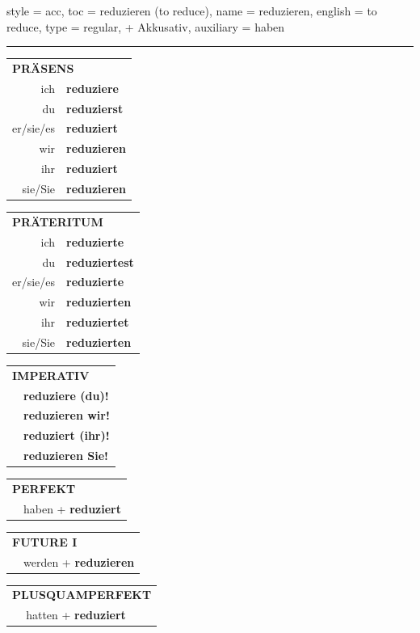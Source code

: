 \begin{verbentry}{
  style = {acc},
  toc = {reduzieren (to reduce)},
  name = {reduzieren},
  english = {to reduce},
  type = {regular, + Akkusativ},
  auxiliary = {haben}
}


\vspace{5pt}
\hrule
\vspace{5pt}

\begin{tabular}{rl}
\multicolumn{2}{l}{\textbf{PRÄSENS}}\\
ich & \textbf{reduziere}\\
du & \textbf{reduzierst}\\
er/sie/es & \textbf{reduziert}\\
wir & \textbf{reduzieren}\\
ihr & \textbf{reduziert}\\
sie/Sie & \textbf{reduzieren}\\
\end{tabular}
\hfill
\begin{tabular}{rl}
\multicolumn{2}{l}{\textbf{PRÄTERITUM}}\\
ich & \textbf{reduzierte}\\
du & \textbf{reduziertest}\\
er/sie/es & \textbf{reduzierte}\\
wir & \textbf{reduzierten}\\
ihr & \textbf{reduziertet}\\
sie/Sie & \textbf{reduzierten}\\
\end{tabular}
\hfill
\begin{tabular}{rl}
\multicolumn{2}{l}{\textbf{IMPERATIV}}\\
& \textbf{reduziere (du)!}\\
& \textbf{reduzieren wir!}\\
& \textbf{reduziert (ihr)!}\\
& \textbf{reduzieren Sie!}\\
\end{tabular}

\vspace{10pt}

\begin{tabular}{rl}
\multicolumn{2}{l}{\textbf{PERFEKT}}\\
& haben + \textbf{reduziert}\\
\end{tabular}
\hfill
\begin{tabular}{rl}
\multicolumn{2}{l}{\textbf{FUTURE I}}\\
& werden + \textbf{reduzieren}\\
\end{tabular}
\hfill
\begin{tabular}{rl}
\multicolumn{2}{l}{\textbf{PLUSQUAMPERFEKT}}\\
& hatten + \textbf{reduziert}\\
\end{tabular}


\end{verbentry}
